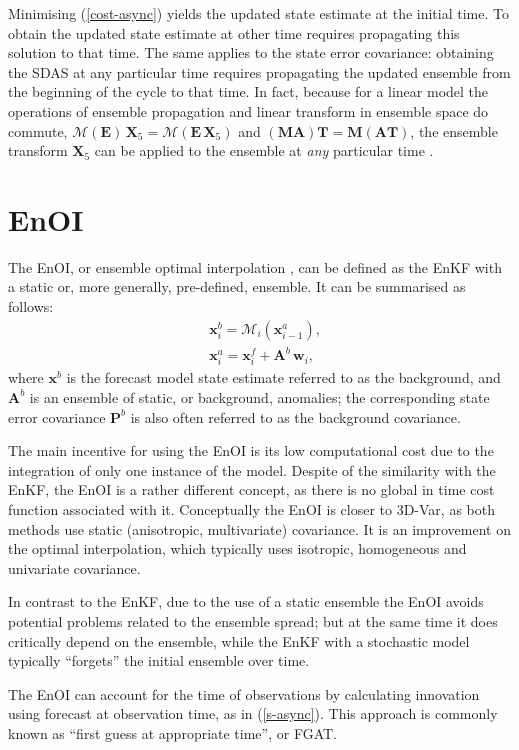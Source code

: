 \documentclass[11pt]{report}
\newcommand{\mb} {\mathbf}
\begin{document}
Minimising (\ref{cost-async}) yields the updated state estimate at the initial time.
To obtain the updated state estimate at other time requires propagating this solution to that time.
The same applies to the state error covariance: obtaining the SDAS at any particular time requires propagating the updated ensemble from the beginning of the cycle to that time.
In fact, because for a linear model the operations of ensemble propagation and linear transform in ensemble space do commute, $\mathcal M (\mb E) \, \mb X_5 = \mathcal M (\mb E \, \mb X_5)$ and $(\mb M \mb A) \mb T = \mb M (\mb A \mb T)$, the ensemble transform $\mb X_5$ can be applied to the ensemble at \emph{any} particular time \citep{eve00a}.

\section{EnOI}

The EnOI, or ensemble optimal interpolation \citep{eve03a}, can be defined as the EnKF with a static or, more generally, pre-defined, ensemble.
It can be summarised as follows:
\begin{align}
  \label{enoi-for}
  & \mb x^b_i = \mathcal M_i(\mb x^a_{i-1}),\\
  & \mb x^a_i = \mb x^f_i + \mb A^b \, \mb w_i,
\end{align}
where $\mb x^b$ is the forecast model state estimate referred to as the background, and $\mb A^b$ is an ensemble of static, or background, anomalies; the corresponding state error covariance $\mb P^b$ is also often referred to as the background covariance.

The main incentive for using the EnOI is its low computational cost due to the integration of only one instance of the model.
Despite of the similarity with the EnKF, the EnOI is a rather different concept, as there is no global in time cost function associated with it.
Conceptually the EnOI is closer to 3D-Var, as both methods use static (anisotropic, multivariate) covariance.
It is an improvement on the optimal interpolation, which typically uses isotropic, homogeneous and univariate covariance.

In contrast to the EnKF, due to the use of a static ensemble the EnOI avoids potential problems related to the ensemble spread; but at the same time it does critically depend on the ensemble, while the EnKF with a stochastic model typically ``forgets'' the initial ensemble over time.

The EnOI can account for the time of observations by calculating innovation using forecast at observation time, as in (\ref{s-async}).
This approach is commonly known as ``first guess at appropriate time'', or FGAT.
\end{document}
